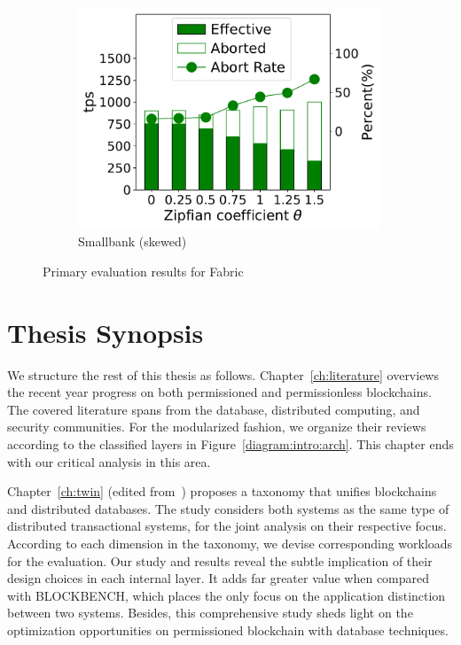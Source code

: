 \begin{figure}[tp]
\begin{subfigure}{0.30\textwidth}
      \includegraphics[width=0.99\textwidth]{chart/intro/smallbank_skew.pdf}
      \caption{Smallbank (skewed)}
      \label{chart:intro:basic:smallbank_skew}
    \end{subfigure}
    \caption{Primary evaluation results for Fabric }
    \label{chart:intro:basic}
\end{figure}

\section{Thesis Synopsis}
We structure the rest of this thesis as follows. Chapter~\ref{ch:literature} overviews the recent year progress on both permissioned and permissionless blockchains. The covered literature spans from the database, distributed computing, and security communities. For the modularized fashion, we organize their reviews according to the classified layers in Figure~\ref{diagram:intro:arch}. This chapter ends with our critical analysis in this area. 

Chapter~\ref{ch:twin} (edited from~\cite{ruan2019blockchains}) proposes a taxonomy that unifies blockchains and distributed databases. 
The study considers both systems as the same type of distributed transactional systems, for the joint analysis on their respective focus. 
According to each dimension in the taxonomy, we devise corresponding workloads for the evaluation. 
Our study and results reveal the subtle implication of their design choices in each internal layer. 
It adds far greater value when compared with BLOCKBENCH, which places the only focus on the application distinction between two systems. 
Besides, this comprehensive study sheds light on the optimization opportunities on permissioned blockchain with database techniques. 

